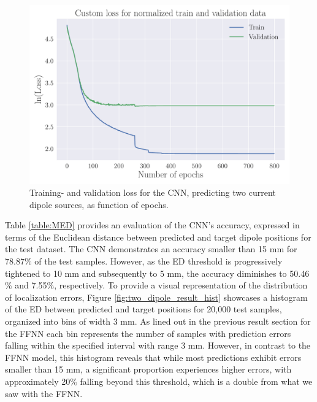 \documentclass[a4paper, UKenglish, 11pt]{uiomaster}
\begin{document}
\begin{figure}[!htb]
    \centering
    \includegraphics[width=\linewidth]{figures/CNN/Custom_Loss_simple_last_run_old_std_2_dipoles_32_0.001_0.35_0.5_0_800_(0).pdf}
    \caption{Training- and validation loss for the CNN, predicting two current dipole sources, as function of epochs.}
    \label{fig:two_dipole_result_CNN}
\end{figure}

\FloatBarrier

Table \ref{table:MED} provides an evaluation of the CNN's accuracy, expressed in terms of the Euclidean distance between predicted and target dipole positions for the test dataset. The CNN demonstrates an accuracy smaller than 15 mm for 78.87$\%$ of the test samples. However, as the ED threshold is progressively tightened to 10 mm and subsequently to 5 mm, the accuracy diminishes to 50.46$\%$ and 7.55$\%$, respectively. To provide a visual representation of the distribution of localization errors, Figure \ref{fig:two_dipole_result_hist} showcases a histogram of the ED between predicted and target positions for 20,000 test samples, organized into bins of width 3 mm. As lined out in the previous result section for the FFNN each bin represents the number of samples with prediction errors falling within the specified interval with range 3 mm. However, in contrast to the FFNN model, this histogram reveals that while most predictions exhibit errors smaller than 15 mm, a significant proportion experiences higher errors, with approximately 20$\%$ falling beyond this threshold, which is a double from what we saw with the FFNN.
\end{document}
